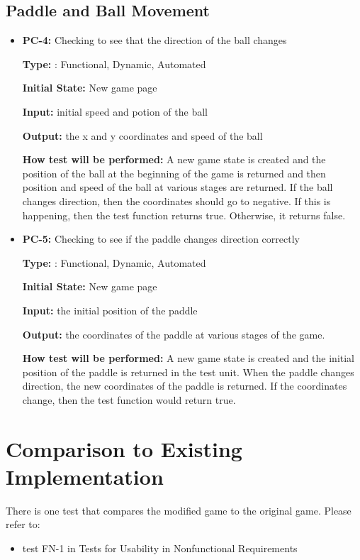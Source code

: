 \documentclass[12pt,letterpaper]{article}
\begin{document}
	\subsection{Paddle and Ball Movement}
\begin{reqbox}
	\begin{itemize}
	\item \textbf{PC-4: }Checking to see that the direction of the ball changes

	\textbf{Type: }: Functional, Dynamic, Automated

	\textbf{Initial State: } New game page

	\textbf{Input: } initial speed and potion of the ball

	\textbf{Output: }the x and y coordinates and speed of the ball

	\textbf{How test will be performed: }A new game state is created and the position of the ball at the beginning of the game is returned and then position and speed of the ball at various stages are returned. If the ball changes direction, then the coordinates should go to negative. If this is happening, then the test function returns true. Otherwise, it returns false.
	\end{itemize}
\end{reqbox}

\begin{reqbox}
	\begin{itemize}
	\item \textbf{PC-5: }Checking to see if the paddle changes direction correctly

	\textbf{Type: }: Functional, Dynamic, Automated
	
	\textbf{Initial State: } New game page

	\textbf{Input: } the initial position of the paddle

	\textbf{Output: }the coordinates of the paddle at various stages of the game.

	\textbf{How test will be performed: }A new game state is created and the initial position of the paddle is returned in the test unit. When the paddle changes direction, the new coordinates of the paddle is returned. If the coordinates change, then the test function would return true.
	\end{itemize}
\end{reqbox}


	\section{Comparison to Existing Implementation}
	 There is one test that compares the modified game to the original game. Please refer to:
	\begin{itemize}
	\item test FN-1 in Tests for Usability in Nonfunctional Requirements
	\end{itemize}
\end{document}
